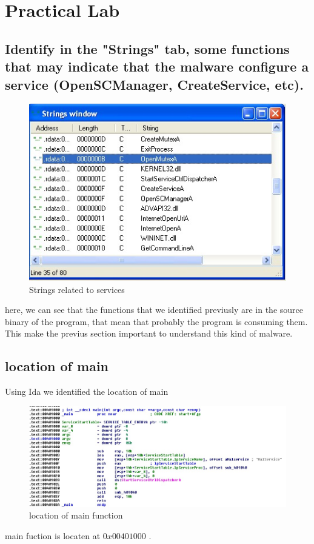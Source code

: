 \documentclass[10pt,a4paper]{article} %
\begin{document}
        \newpage
    \section{Practical Lab}

        \subsection{Identify in the "Strings" tab, some functions that may
            indicate that the malware configure a service (OpenSCManager,
            CreateService, etc).}

            \begin{figure}[h!]
                \centering
                \includegraphics[width=0.8\linewidth]{4.png}
                \caption{Strings related to services}
                \label{stringsrelated}
            \end{figure}
            here, we can see that the functions that we identified previusly
            are in the source binary of the program, that mean that probably
            the program is consuming them. This make the previus section
            important to understand this kind of malware.

        \subsection{location of main}
            Using Ida we identified the location of main
            \begin{figure}[h!]
                \centering
                \includegraphics[width=0.8\linewidth]{loc.jpeg}
                \caption{location of main function}
                \label{locationmainfuction}
            \end{figure}
            main fuction is locaten at $ 0x00401000  $ .
\end{document}
